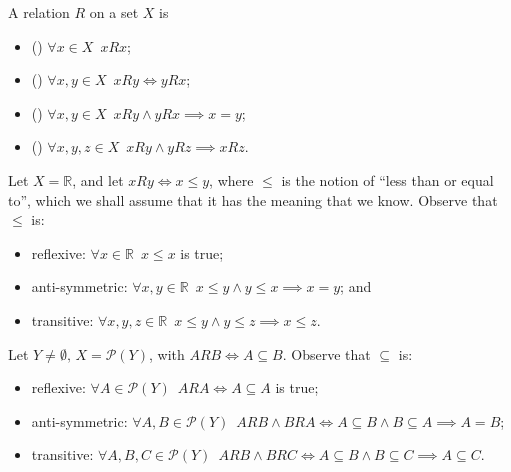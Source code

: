 \documentclass[notoc,notitlepage]{tufte-book}
\begin{document}
\begin{defn}[Relations]
\label{defn:relations}
  A relation $R$ on a set $X$ is 
  \begin{itemize}
    \item () $\forall x \in X \enspace xRx$;
    \item () $\forall x, y \in X \enspace xRy \iff yRx$;
    \item () $\forall x, y \in X \enspace xRy \land yRx \implies x = y$;
    \item () $\forall x, y , z \in X \enspace xRy \land yRz \implies xRz$.
  \end{itemize}
\end{defn}

\begin{eg}
  Let $X = \mathbb{R}$, and let $xRy \iff x \leq y$, where $\leq$ is the notion of ``less than or equal to'', which we shall assume that it has the meaning that we know. Observe that $\leq$ is:
  \begin{itemize}
    \item reflexive: $\forall x \in \mathbb{R} \enspace x \leq x$ is true;
    \item anti-symmetric: $\forall x, y \in \mathbb{R} \enspace x \leq y \land y \leq x \implies x = y$; and
    \item transitive: $\forall x, y , z \in \mathbb{R} \enspace x \leq y \land y \leq z \implies x \leq z$.
  \end{itemize}
\end{eg}

\begin{eg}
  Let $Y \neq \emptyset, \, X = \mathcal{P}(Y)$, with $ARB \iff A \subseteq B$. Observe that $\subseteq$ is:
  \begin{itemize}
    \item reflexive: $\forall A \in \mathcal{P}(Y) \enspace ARA \iff A \subseteq A$ is true;
    \item anti-symmetric: $\forall A, B \in \mathcal{P}(Y) \enspace ARB \land BRA \iff A \subseteq B \land B \subseteq A \implies A = B$;
    \item transitive: $\forall A, B, C \in \mathcal{P}(Y) \enspace ARB \land BRC \iff A \subseteq B \land B \subseteq C \implies A \subseteq C$.
  \end{itemize}
\end{eg}
\end{document}
